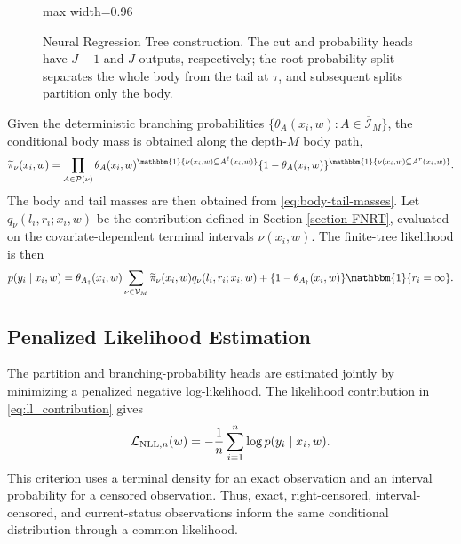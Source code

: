 \documentclass[11pt]{article}
\numberwithin{equation}{section}
\begin{document}
\begin{figure}[ht]
\begin{adjustbox}{max width=0.96\textwidth}
\end{adjustbox}
\caption{Neural Regression Tree construction. The cut and probability heads have $J-1$ and $J$ outputs, respectively; the root probability split separates the whole body from the tail at $\tau$, and subsequent splits partition only the body.}
\label{fig:nn-structure}
\end{figure}

Given the deterministic branching probabilities $\{\theta_A(x_i,w):A\in\overline{\mathcal I}_M\}$, the conditional body mass is obtained along the depth-$M$ body path,
$$
    \widetilde\pi_{\nu}(x_i,w)
    =
    \prod_{A\in \mathcal{P}(\nu)}
    \theta_A(x_i,w)^{\mathbbm{1}\{\nu(x_i,w)\subseteq A^\ell(x_i,w)\}}
    \{1-\theta_A(x_i,w)\}^{\mathbbm{1}\{\nu(x_i,w)\subseteq A^r(x_i,w)\}} .
$$
The body and tail masses are then obtained from \eqref{eq:body-tail-masses}. Let $q_\nu(l_i,r_i;x_i,w)$ be the contribution defined in Section \ref{section-FNRT}, evaluated on the covariate-dependent terminal intervals $\nu(x_i,w)$. The finite-tree likelihood is then
\begin{equation}
    p(y_i\mid x_i,w)
    =
    \theta_{A_\dagger}(x_i,w)\sum_{\nu\in\mathcal V_M}
    \widetilde\pi_{\nu}(x_i,w)
    q_{\nu}(l_i,r_i;x_i,w)
    +\{1-\theta_{A_\dagger}(x_i,w)\}\mathbbm{1}\{r_i=\infty\}.
\label{eq:ll_contribution}
\end{equation}
\subsection{Penalized Likelihood Estimation}
\label{section-nrt-estimation}

The partition and branching-probability heads are estimated jointly by minimizing a penalized negative log-likelihood. The likelihood contribution in \eqref{eq:ll_contribution} gives
\begin{equation}
    \mathcal{L}_{\mathrm{NLL},n}(w)
    =-\frac{1}{n}\sum_{i=1}^n\log p(y_i\mid x_i,w).
    \label{eq:nll}
\end{equation}
This criterion uses a terminal density for an exact observation and an interval probability for a censored observation. Thus, exact, right-censored, interval-censored, and current-status observations inform the same conditional distribution through a common likelihood.
\end{document}
